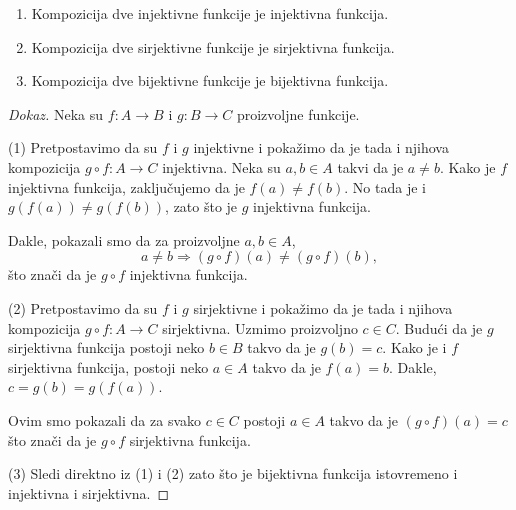 \begin{THM}
  \begin{enumerate}
  \item
    Kompozicija dve injektivne funkcije je injektivna funkcija.
  \item
    Kompozicija dve sirjektivne funkcije je sirjektivna funkcija.
  \item
    Kompozicija dve bijektivne funkcije je bijektivna funkcija.
  \end{enumerate}
\end{THM}
\begin{proof}[Dokaz]
  Neka su $f : A \to B$ i $g : B \to C$ proizvoljne funkcije.

  \medskip

  (1)
  Pretpostavimo da su $f$ i $g$ injektivne i poka\v zimo da je tada i njihova kompozicija $g \circ f : A \to C$ injektivna.
  Neka su $a, b \in A$ takvi da je $a \ne b$. Kako je $f$ injektivna funkcija, zaklju\v cujemo da je
  $f(a) \ne f(b)$. No tada je i $g(f(a)) \ne g(f(b))$, zato \v sto je $g$ injektivna funkcija.
  \begin{center}
    
  \end{center}
  Dakle, pokazali smo
  da za proizvoljne $a, b \in A$,
  $$
    a \ne b \Rightarrow (g \circ f)(a) \ne (g \circ f)(b),
  $$
  \v sto zna\v ci da je $g \circ f$ injektivna funkcija.

  \medskip
  
  (2)
  Pretpostavimo da su $f$ i $g$ sirjektivne i poka\v zimo da je tada i njihova kompozicija $g \circ f : A \to C$ sirjektivna.
  Uzmimo proizvoljno $c \in C$. Budu\'ci da je $g$ sirjektivna funkcija postoji neko $b \in B$ takvo da je $g(b) = c$.
  Kako je i $f$ sirjektivna funkcija, postoji neko $a \in A$ takvo da je $f(a) = b$. Dakle,
  $c = g(b) = g(f(a))$.
  \begin{center}
    
  \end{center}
  Ovim smo pokazali da za svako $c \in C$ postoji $a \in A$ takvo da je $(g \circ f)(a) = c$ \v sto
  zna\v ci da je $g \circ f$ sirjektivna funkcija.
  
  \medskip
  
  (3)
  Sledi direktno iz (1) i (2) zato \v sto je bijektivna funkcija istovremeno i injektivna i sirjektivna.
\end{proof}

